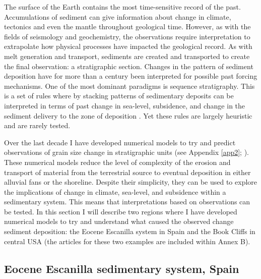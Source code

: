 The surface of the Earth contains the most time-sensitive record of the past. Accumulations of sediment can give information about change in climate, tectonics and even the mantle throughout geological time. However, as with the fields of seismology and geochemistry, the observations require interpretation to extrapolate how physical processes have impacted the geological record. As with melt generation and transport, sediments are created and transported to create the final observation: a stratigraphic section. Changes in the pattern of sediment deposition have for more than a century been interpreted for possible past forcing mechanisms. One of the most dominant paradigms is sequence stratigraphy. This is a set of rules where by stacking patterns of sedimentary deposits can be interpreted in terms of past change in sea-level, subsidence, and change in the sediment delivery to the zone of deposition \citep[e.g.][]{vail-etal-1977,vanwagoner-etal-1990,catuneanu-etal-2009}. Yet these rules are largely heuristic and are rarely tested.

Over the last decade I have developed numerical models to try and predict observations of grain size change in stratigraphic units (see Appendix \ref{app2}; \citealp{armitage-etal-ngeo-2011,armitage-etal-2015,armitage-etal-br-2018}). These numerical models reduce the level of complexity of the erosion and transport of material from the terrestrial source to eventual deposition in either alluvial fans or the shoreline. Despite their simplicity, they can be used to explore the implications of change in climate, sea-level, and subsidence within a sedimentary system. This means that interpretations based on observations can be tested. In this section I will describe two regions where I have developed numerical models to try and understand what caused the observed change sediment deposition: the Eocene Escanilla system in Spain and the Book Cliffs in central USA (the articles for these two examples are included within Annex B).

\subsection{Eocene Escanilla sedimentary system, Spain}

